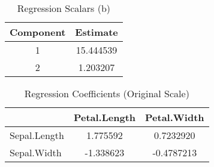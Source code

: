 \documentclass{article}
\begin{document}
\begin{table}[H]
\centering
\caption{\label{tab:unnamed-chunk-8}Regression Scalars (b)}
\centering
\begin{tabular}[t]{|>{}c>{}c|}
\toprule
Component & Estimate\\
\midrule
1 & 15.444539\\
2 & 1.203207\\
\bottomrule
\end{tabular}
\end{table}

\begin{table}[H]
\centering
\caption{\label{tab:unnamed-chunk-8}Regression Coefficients (Original Scale)}
\centering
\begin{tabular}[t]{|>{}lc>{}c|}
\toprule
  & Petal.Length & Petal.Width\\
\midrule
Sepal.Length & 1.775592 & 0.7232920\\
Sepal.Width & -1.338623 & -0.4787213\\
\bottomrule
\end{tabular}
\end{table}

\begin{table}[H]
\centering
\caption{\label{tab:unnamed-chunk-8}Variance Explained by Components (X)}
\centering
{}
\end{table}

\begin{table}[H]
\centering
\caption{\label{tab:unnamed-chunk-8}Variance Explained by Components (Y)}
\centering
{}
\end{table}
\end{document}
